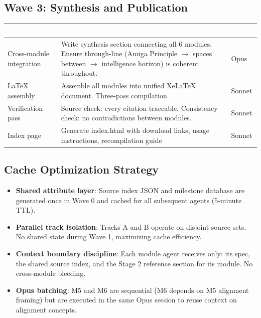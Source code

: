 \documentclass[11pt,letterpaper]{article}
\newcommand{\tableheader}[1]{\textbf{\sffamily\textcolor{white}{#1}}}
\begin{document}
\subsection{Wave 3: Synthesis and Publication}

\begin{center}
\begin{tabularx}{\textwidth}{L{3cm}XC{2cm}}
\toprule
{}
\tableheader{Task} & \tableheader{Specification} & \tableheader{Model} \\
\midrule
Cross-module integration & Write synthesis section connecting all 6 modules. Ensure through-line (Amiga Principle $\to$ spaces between $\to$ intelligence horizon) is coherent throughout. & Opus \\
LaTeX assembly & Assemble all modules into unified XeLaTeX document. Three-pass compilation. & Sonnet \\
Verification pass & Source check: every citation traceable. Consistency check: no contradictions between modules. & Sonnet \\
Index page & Generate index.html with download links, usage instructions, recompilation guide & Sonnet \\
\bottomrule
\end{tabularx}
\end{center}

\subsection{Cache Optimization Strategy}

\begin{itemize}[leftmargin=*]
\item \textbf{Shared attribute layer}: Source index JSON and milestone database are generated once in Wave 0 and cached for all subsequent agents (5-minute TTL).
\item \textbf{Parallel track isolation}: Tracks A and B operate on disjoint source sets. No shared state during Wave 1, maximizing cache efficiency.
\item \textbf{Context boundary discipline}: Each module agent receives only: its spec, the shared source index, and the Stage 2 reference section for its module. No cross-module bleeding.
\item \textbf{Opus batching}: M5 and M6 are sequential (M6 depends on M5 alignment framing) but are executed in the same Opus session to reuse context on alignment concepts.
\end{itemize}
\end{document}
